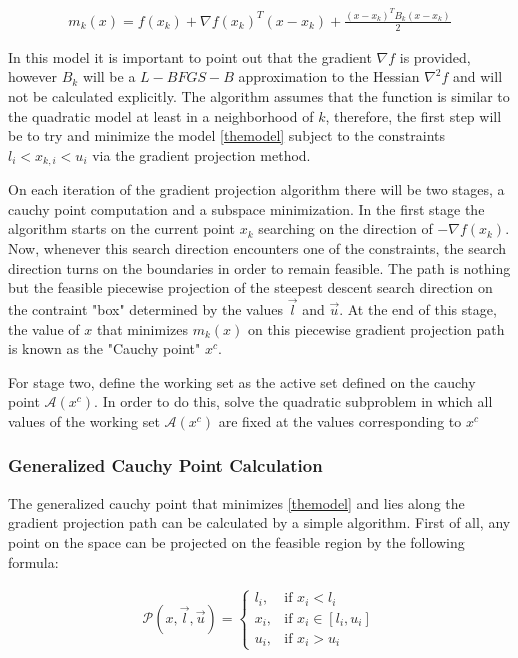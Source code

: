 \begin{equation} \label{themodel}
  \begin{aligned}
    m_k(x) = f(x_k) + \nabla f(x_k)^T ( x - x_k) + \frac{(x - x_k)^T B_k (x - x_k) }{2}
  \end{aligned}
\end{equation}

In this model it is important to point out that the gradient $\nabla f$ is provided, however $B_k$ will be a $L-BFGS-B$ approximation to the Hessian $\nabla^2 f$ and will not be calculated explicitly.  The algorithm assumes that the function is similar to the quadratic model at least in a neighborhood of $k$, therefore, the first step will be to try and minimize the model \ref{themodel} subject to the constraints $l_i < x_{k, i} < u_i$ via the gradient projection method.

On each iteration of the gradient projection algorithm there will be two stages, a cauchy point computation and a subspace minimization.  In the first stage the algorithm starts on the current point $x_k$ searching on the direction of $-\nabla f(x_k)$.  Now, whenever this search direction encounters one of the constraints, the search direction turns on the boundaries in order to remain feasible.  The path is nothing but the feasible piecewise projection of the steepest descent search direction on the contraint "box" determined by the values $\overrightarrow{l}$ and $\overrightarrow{u}$.  At the end of this stage, the value of $x$ that minimizes $m_k(x)$ on this piecewise gradient projection path is known as the "Cauchy point" $x^c$.

For stage two, define the working set as the active set defined on the cauchy point $\mathcal{A}(x^c)$.  In order to do this, solve the quadratic subproblem in which all values of the working set $\mathcal{A}(x^c)$ are fixed at the values corresponding to $x^c$

\subsubsection{Generalized Cauchy Point Calculation}

The generalized cauchy point that minimizes \ref{themodel} and lies along the gradient projection path can be calculated by a simple algorithm.  First of all, any point on the space can be projected on the feasible region by the following formula: 

\begin{equation}
  \begin{aligned}
    \mathcal{P}(x, \vec{l}, \vec{u}) = 
    \begin{cases}
      l_i, & \text{if } x_i < l_i \\
      x_i, & \text{if } x_i \in [l_i, u_i] \\
      u_i, & \text{if } x_i > u_i
    \end{cases}
  \end{aligned}
\end{equation}

